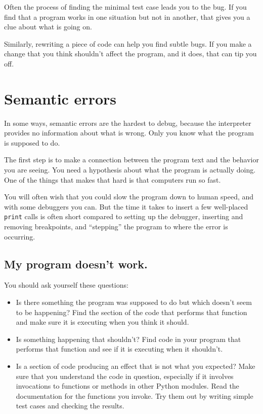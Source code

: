 \documentclass[10pt]{book}
\begin{document}

Often the process of finding the minimal test case leads you to the
bug.  If you find that a program works in one situation but not in
another, that gives you a clue about what is going on.

Similarly, rewriting a piece of code can help you find subtle
bugs.  If you make a change that you think shouldn't affect the
program, and it does, that can tip you off.


\section{Semantic errors}

In some ways, semantic errors are the hardest to debug,
because the interpreter provides no information
about what is wrong.  Only you know what the program is supposed to
do.

The first step is to make a connection between the program
text and the behavior you are seeing.  You need a hypothesis
about what the program is actually doing.  One of the things
that makes that hard is that computers run so fast.

You will often wish that you could slow the program down to human
speed, and with some debuggers you can.  But the time it takes to
insert a few well-placed {\tt print} calls is often short compared to
setting up the debugger, inserting and removing breakpoints, and
``stepping'' the program to where the error is occurring.

\subsection{My program doesn't work.}

You should ask yourself these questions:

\begin{itemize}

\item Is there something the program was supposed to do but
which doesn't seem to be happening?  Find the section of the code
that performs that function and make sure it is executing when
you think it should.

\item Is something happening that shouldn't?  Find code in
your program that performs that function and see if it is
executing when it shouldn't.

\item Is a section of code producing an effect that is not
what you expected?  Make sure that you understand the code in
question, especially if it involves invocations to functions or methods in
other Python modules.  Read the documentation for the functions you invoke.
Try them out by writing simple test cases and checking the results.

\end{itemize}
\end{document}
